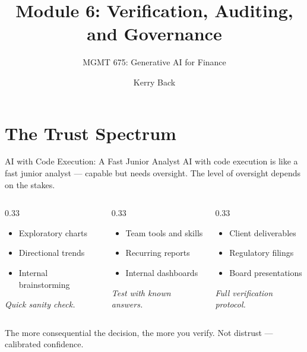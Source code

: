 \documentclass[aspectratio=169]{beamer}
\subtitle{MGMT 675: Generative AI for Finance}
\title{Module 6: Verification, Auditing, and Governance}
\author{Kerry Back}
\date{}
\begin{document}
\maketitle

\section{The Trust Spectrum}

\begin{frame}[shrink=5]{AI with Code Execution: A Fast Junior Analyst}
AI with code execution is like a \alert{fast junior analyst} --- capable but needs oversight. The level of oversight depends on the stakes.
\vspace{0.3cm}
\begin{columns}[T]
\begin{column}{0.33\textwidth}
\begin{shadedbox}[title=\textbf{Low-Stakes}]
\begin{itemize}\small
  \item Exploratory charts
  \item Directional trends
  \item Internal brainstorming
\end{itemize}
\vspace{0.2cm}
\centering\small\textit{Quick sanity check.}
\end{shadedbox}
\end{column}
\begin{column}{0.33\textwidth}
\begin{shadedbox}[title=\textbf{Medium-Stakes}]
\begin{itemize}\small
  \item Team tools and skills
  \item Recurring reports
  \item Internal dashboards
\end{itemize}
\vspace{0.2cm}
\centering\small\textit{Test with known answers.}
\end{shadedbox}
\end{column}
\begin{column}{0.33\textwidth}
\begin{shadedbox}[title=\textbf{High-Stakes}]
\begin{itemize}\small
  \item Client deliverables
  \item Regulatory filings
  \item Board presentations
\end{itemize}
\vspace{0.2cm}
\centering\small\textit{Full verification protocol.}
\end{shadedbox}
\end{column}
\end{columns}
\vspace{0.3cm}
The more consequential the decision, the more you verify. \alert{Not distrust --- calibrated confidence.}
\end{frame}
\end{document}
